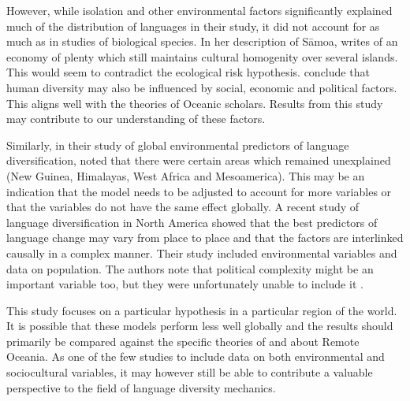 \documentclass[a4paper,10pt]{article} %
\begin{document}
However, while isolation and other environmental factors significantly explained much of the distribution of languages in their study, it did not account for as much as in studies of biological species. In her description of S\={a}moa, \citet[287]{mead1937samoans} writes of an economy of plenty which still maintains cultural homogenity over several islands. This would seem to contradict the ecological risk hypothesis. \citet{gavin2012island} conclude that human diversity may also be influenced by social, economic and political factors. This aligns well with the theories of Oceanic scholars. Results from this study may contribute to our understanding of these factors.



Similarly, in their study of global environmental predictors of language diversification, \citet{hua2019ecological} noted that there were certain areas which remained unexplained (New Guinea, Himalayas, West Africa and Mesoamerica). This may be an indication that the model needs to be adjusted to account for more variables or that the variables do not have the same effect globally. A recent study of language diversification in North America \citep{Pacheco_Coelho_2019} showed that the best predictors of language change may vary from place to place and that the factors are interlinked causally in a complex manner. Their study included environmental variables and data on population. The authors note that political complexity might be an important variable too, but they were unfortunately unable to include it \citep[7]{Pacheco_Coelho_2019}.

This study focuses on a particular hypothesis in a particular region of the world. It is possible that these models perform less well globally and the results should primarily be compared against the specific theories of \citet{lynch1981melanesian} and \citet{pawley81, pawley2007} about Remote Oceania. As one of the few studies to include data on both environmental and sociocultural variables, it may however still be able to contribute a valuable perspective to the field of language diversity mechanics.
\end{document}
